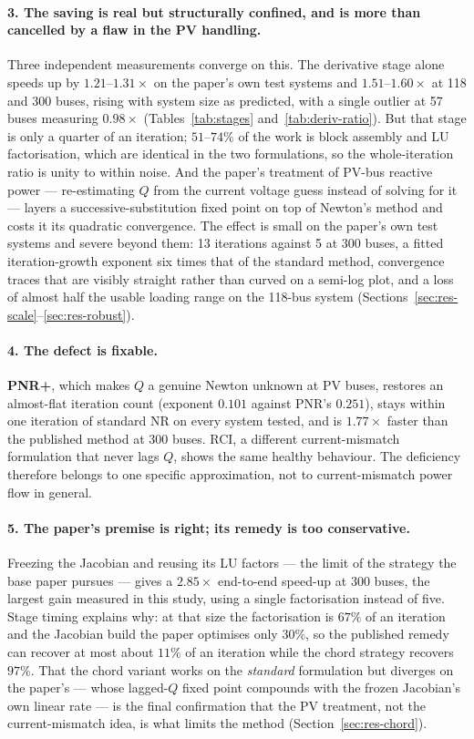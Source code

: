 \documentclass[sigconf,nonacm]{acmart}
\begin{document}
\paragraph{3. The saving is real but structurally confined, and is more than
cancelled by a flaw in the PV handling.}
Three independent measurements converge on this. The derivative stage alone
speeds up by $1.21$--$1.31\times$ on the paper's own test systems and
$1.51$--$1.60\times$ at 118 and 300 buses, rising with system size as predicted,
with a single outlier at 57 buses measuring $0.98\times$
(Tables~\ref{tab:stages} and~\ref{tab:deriv-ratio}). But that stage is only a
quarter of an iteration; $51$--$74\%$ of the work is block assembly and LU
factorisation, which are identical in the two formulations, so the
whole-iteration ratio is unity to within noise. And the paper's treatment of
PV-bus reactive power --- re-estimating $Q$ from the current voltage guess
instead of solving for it --- layers a successive-substitution fixed point on
top of Newton's method and costs it its quadratic convergence. The effect is
small on the paper's own test systems and severe beyond them: 13 iterations
against 5 at 300 buses, a fitted iteration-growth exponent six times that of the
standard method, convergence traces that are visibly straight rather than curved
on a semi-log plot, and a loss of almost half the usable loading range on the
118-bus system (Sections~\ref{sec:res-scale}--\ref{sec:res-robust}).

\paragraph{4. The defect is fixable.}
\textbf{PNR+}, which makes $Q$ a genuine Newton unknown at PV buses, restores an
almost-flat iteration count (exponent $0.101$ against PNR's $0.251$), stays
within one iteration of standard NR on every system tested, and is
$1.77\times$ faster than the published method at 300 buses. RCI, a different
current-mismatch formulation that never lags $Q$, shows the same healthy
behaviour. The deficiency therefore belongs to one specific approximation, not
to current-mismatch power flow in general.

\paragraph{5. The paper's premise is right; its remedy is too conservative.}
Freezing the Jacobian and reusing its LU factors --- the limit of the strategy
the base paper pursues --- gives a $2.85\times$ end-to-end speed-up at 300 buses,
the largest gain measured in this study, using a single factorisation instead of
five. Stage timing explains why: at that size the factorisation is $67\%$ of an
iteration and the Jacobian build the paper optimises only $30\%$, so the
published remedy can recover at most about $11\%$ of an iteration while the
chord strategy recovers $97\%$. That the chord variant works on the
\emph{standard} formulation but diverges on the paper's --- whose lagged-$Q$
fixed point compounds with the frozen Jacobian's own linear rate --- is the final
confirmation that the PV treatment, not the current-mismatch idea, is what
limits the method (Section~\ref{sec:res-chord}).
\end{document}

